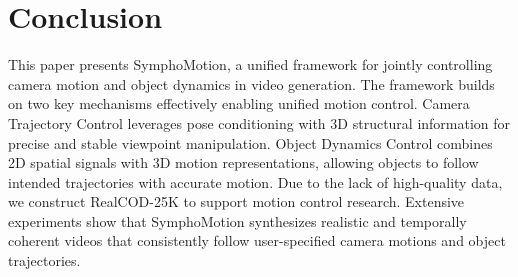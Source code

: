 \section{Conclusion}
This paper presents SymphoMotion, a unified framework for jointly controlling camera motion and object dynamics in video generation. The framework builds on two key mechanisms effectively enabling unified motion control. Camera Trajectory Control leverages pose conditioning with 3D structural information for precise and stable viewpoint manipulation. Object Dynamics Control combines 2D spatial signals with 3D motion representations, allowing objects to follow intended trajectories with accurate motion. Due to the lack of high-quality data, we construct RealCOD-25K to support motion control research. Extensive experiments show that SymphoMotion synthesizes realistic and temporally coherent videos that consistently follow user-specified camera motions and object trajectories.